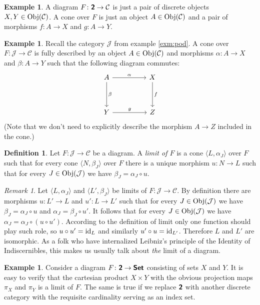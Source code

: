 \documentclass[12pt]{article}
\theoremstyle{definition}
\newtheorem{dfn}[thm]{Definition}
\newtheorem{exm}[thm]{Example}
\theoremstyle{remark}
\newtheorem{rem}[thm]{Remark}
\newcommand{\catvar}[1]{\mathcal{#1}}
\newcommand{\CC}{\catvar{C}}
\newcommand{\JJ}{\catvar{J}}
\newcommand{\catname}[1]{\textup{\sffamily\textbf{#1}}}
\newcommand*{\Set}{\catname{Set}}
\newcommand{\Obj}[1]{\textup{Obj}(#1)}
\begin{document}
    \begin{exm}
        A diagram $F\colon\catname{2}\to\CC$ is just a pair of discrete objects $X,Y\in\Obj{\CC}$. A cone over $F$ is just an object $A\in\Obj{\CC}$ and a pair of morphisms $f\colon A\to X$ and $g\colon A\to Y$.
    \end{exm}
    
    \begin{exm}
        Recall the category $\JJ$ from example \ref{exm:pod}. A cone over $F:\JJ\to\CC$ is fully described by an object $A\in\Obj{\CC}$ and morphisms $\alpha\colon A\to X$ and $\beta\colon A\to Y$ such that the following diagram commutes:
        \[\begin{tikzcd}
            A && X \\
            \\
            Y && Z
            \arrow["\alpha", from=1-1, to=1-3]
            \arrow["\beta", from=1-1, to=3-1]
            \arrow["f", from=1-3, to=3-3]
            \arrow["g", from=3-1, to=3-3]
        \end{tikzcd}\]
        (Note that we don't need to explicitly describe the morphism $A\to Z$ included in the cone.)
    \end{exm}

    \begin{dfn}
        Let $F\colon\JJ\to\CC$ be a diagram. A \emph{limit of $F$} is a cone $\langle L,\alpha_J\rangle$ over $F$ such that for every cone $\langle N,\beta_J\rangle$ over $F$ there is a unique morphism $u\colon N\to L$ such that for every $J\in\Obj{\JJ}$ we have $\beta_J=\alpha_J\circ u$.
    \end{dfn}

    \begin{rem}
        Let $\langle L,\alpha_J\rangle$ and $\langle L',\beta_J\rangle$ be limits of $F:\JJ\to\CC$. By definition there are morphisms $u\colon L'\to L$ and $u'\colon L\to L'$ such that for every $J\in\Obj{\JJ}$ we have $\beta_J=\alpha_J\circ u$ and $\alpha_J=\beta_J\circ u'$. It follows that for every $J\in\Obj{\JJ}$ we have $\alpha_J=\alpha_J\circ(u\circ u')$. According to the definition of limit only one function should play such role, so $u\circ u'=\textup{id}_L$ and similarly $u'\circ u=\textup{id}_{L'}$. Therefore $L$ and $L'$ are isomorphic. As a folk who have internalized Leibniz's principle of the Identity of Indiscernibles, this makes us usually talk about \emph{the} limit of a diagram.
    \end{rem}

    \begin{exm}
        Consider a diagram $F\colon\catname{2}\to\Set$ consisting of sets $X$ and $Y$. It is easy to verify that the cartesian product $X\times Y$ with the obvious projection maps $\pi_X$ and $\pi_Y$ is a limit of $F$. The same is true if we replace $\catname{2}$ with another discrete category with the requisite cardinality serving as an index set.
    \end{exm}
\end{document}

